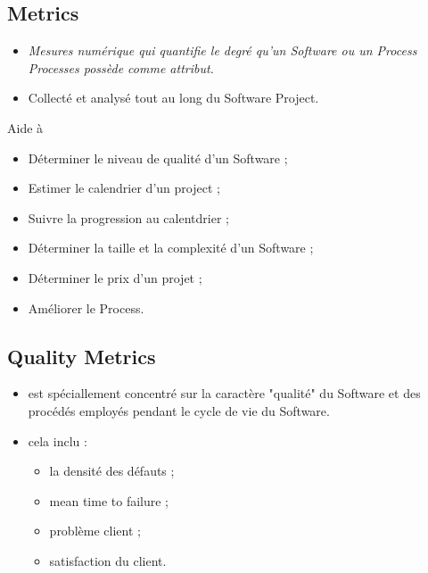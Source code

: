 \subsection{Metrics}
\begin{itemize}
    \item \textit{Mesures numérique qui quantifie le degré qu'un Software ou un Process Processes possède comme attribut.}
	\item Collecté et analysé tout au long du Software Project.
\end{itemize}
Aide à
\begin{itemize}
    \item Déterminer le niveau de qualité d'un Software ;
	\item Estimer le calendrier d'un project ;
	\item Suivre la progression au calentdrier ;
	\item Déterminer la taille et la complexité d'un Software ;
	\item Déterminer le prix d'un projet ;
	\item Améliorer le Process.
\end{itemize}



\subsection{Quality Metrics}
\begin{itemize}
    \item est spéciallement concentré sur la caractère "qualité" du Software et des procédés employés pendant le cycle de vie du Software.
	\item cela inclu :
		\begin{itemize}
			\item la densité des défauts ;
			\item mean time to failure ;
			\item problème client ;
			\item satisfaction du client.
		\end{itemize}
\end{itemize}
